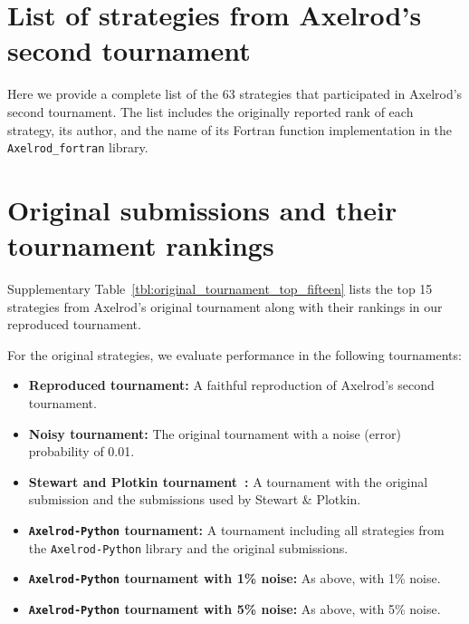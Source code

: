 \documentclass{article}
\newcommand{\TFT}{\emph{TFT}}
\newcommand{\AXL}{\texttt{Axelrod-Python}}
\newcommand{\AXLFortran}{\texttt{Axelrod\_fortran}}
\begin{document}
\section{List of strategies from Axelrod's second tournament}\label{app:list_of_original_players}

Here we provide a complete list of the 63 strategies that participated in
Axelrod's second tournament. The list includes the originally reported rank of each strategy, its
author, and the name of its Fortran function implementation in the
\AXLFortran{} library.

\begin{multicols}{2}
    \begin{enumerate}
        
    \end{enumerate}
\end{multicols}

\section{Original submissions and their tournament rankings}\label{app:tournament_rankings}

Supplementary Table~\ref{tbl:original_tournament_top_fifteen} lists the top 15
strategies from Axelrod's original tournament along with their rankings in our
reproduced tournament.

\begin{table}[!hbtp]
  \centering
  \resizebox{.9\textwidth}{!}{
    }
  \caption{\textbf{Top 15 strategies in the reproduced tournament.}
  The table lists the top 15 strategies from Axelrod's original tournament
  along with their rankings in our reproduced tournament. For each strategy, we
  report the average score and the average cooperation rate in the reproduced
  tournament, as well as the proportion of wins across our repetitions of the
  original tournament. \TFT{} wins 63.3\% of these repetitions, indicating that
  in 36.7\% of runs a different winner emerges.}
  \label{tbl:original_tournament_top_fifteen}
\end{table}

For the original strategies, we evaluate performance in the following
tournaments:
\begin{itemize}
    \item \textbf{Reproduced tournament:} A faithful reproduction of Axelrod's second tournament.
    \item \textbf{Noisy tournament:} The original tournament with a noise (error) probability of 0.01.
    \item \textbf{Stewart and Plotkin tournament~\cite{Stewart2012}:} A tournament with the original submission and the submissions used by Stewart \& Plotkin.
    \item \textbf{\AXL{} tournament:} A tournament including all strategies from the \AXL{} library and the original submissions.
    \item \textbf{\AXL{} tournament with 1\% noise:} As above, with 1\% noise.
    \item \textbf{\AXL{} tournament with 5\% noise:} As above, with 5\% noise.
\end{itemize}
\end{document}
